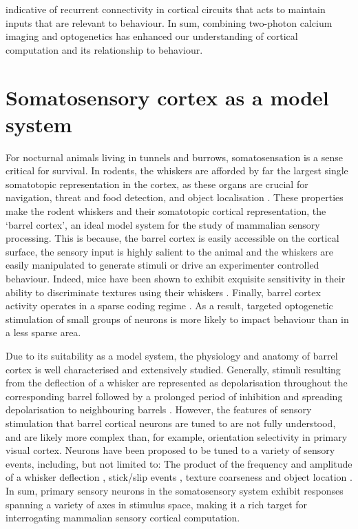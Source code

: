 indicative of recurrent connectivity in cortical circuits that acts to maintain inputs that are relevant to behaviour. In sum, combining two-photon calcium imaging and optogenetics has enhanced our understanding of cortical computation and its relationship to behaviour. 

\section{Somatosensory cortex as a model system}

For nocturnal animals living in tunnels and burrows, somatosensation is a sense critical for survival. In rodents, the whiskers are afforded by far the largest single somatotopic representation in the cortex, as these organs are crucial for navigation, threat and food detection, and object localisation \cite{gustafson_behavioral_1977}. These properties make the rodent whiskers and their somatotopic cortical representation, the ‘barrel cortex’, an ideal model system for the study of mammalian sensory processing. This is because, the barrel cortex is easily accessible on the cortical surface, the sensory input is highly salient to the animal and the whiskers are easily manipulated to generate stimuli or drive an experimenter controlled behaviour. Indeed, mice have been shown to exhibit exquisite sensitivity in their ability to discriminate textures using their whiskers \cite{wu_novel_2013}. Finally, barrel cortex activity operates in a sparse coding regime \cite{crochet_synaptic_2011}. As a result, targeted optogenetic stimulation of small groups of neurons is more likely to impact behaviour than in a less sparse area.

Due to its suitability as a model system, the physiology \cite{feldmeyer_barrel_2013} and anatomy \cite{petersen_functional_2007} of barrel cortex is well characterised and extensively studied. Generally, stimuli resulting from the deflection of a whisker are represented as depolarisation throughout the corresponding barrel \cite{crochet_synaptic_2011} followed by a prolonged period of inhibition \cite{simons_response_1978} and spreading depolarisation to neighbouring barrels \cite{ferezou_visualizing_2006}. However, the features of sensory stimulation that barrel cortical neurons are tuned to are not fully understood, and are likely more complex than, for example, orientation selectivity in primary visual cortex. Neurons have been proposed to be tuned to a variety of sensory events, including, but not limited to: The product of the frequency and amplitude of a whisker deflection \cite{arabzadeh_encoding_2003}, stick/slip events \cite{jadhav_sparse_2009}, texture coarseness \cite{garion_texture_2014} and object location \cite{oconnor_neural_2010}. In sum, primary sensory neurons in the somatosensory system exhibit responses spanning a variety of axes in stimulus space, making it a rich target for interrogating mammalian sensory cortical computation. 

